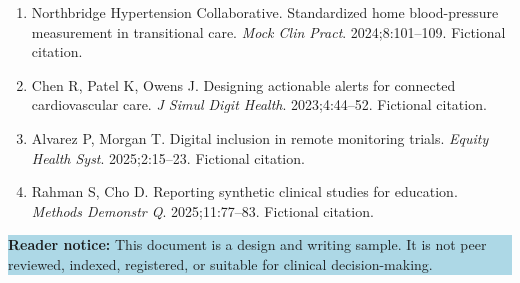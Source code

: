 \documentclass[9pt,twocolumn]{article}
\begin{document}
{\scriptsize
\begin{enumerate}[leftmargin=1.45em,itemsep=2pt]
\item Northbridge Hypertension Collaborative. Standardized home blood-pressure measurement in transitional care. \textit{Mock Clin Pract}. 2024;8:101--109. Fictional citation.
\item Chen R, Patel K, Owens J. Designing actionable alerts for connected cardiovascular care. \textit{J Simul Digit Health}. 2023;4:44--52. Fictional citation.
\item Alvarez P, Morgan T. Digital inclusion in remote monitoring trials. \textit{Equity Health Syst}. 2025;2:15--23. Fictional citation.
\item Rahman S, Cho D. Reporting synthetic clinical studies for education. \textit{Methods Demonstr Q}. 2025;11:77--83. Fictional citation.
\end{enumerate}
}

\vfill
\noindent\colorbox{lightblue}{\parbox{0.94\columnwidth}{\scriptsize\textbf{Reader notice:} This document is a design and writing sample. It is not peer reviewed, indexed, registered, or suitable for clinical decision-making.}}
\end{document}
